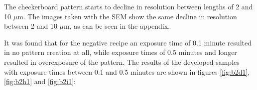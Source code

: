 
The checkerboard pattern starts to decline in resolution between lengths of 2 and 10 $\mu$m. The images taken with the SEM show the same decline in resolution between 2 and 10 $\mu$m, as can be seen in the appendix.


It was found that for the negative recipe an exposure time of 0.1 minute resulted in no pattern creation at all, while exposure times of 0.5 minutes and longer resulted in overexposure of the pattern. The results of the developed samples with exposure times between 0.1 and 0.5 minutes are shown in figures \ref{fig:b2d1}, \ref{fig:b2h1} and \ref{fig:b2i1}:

